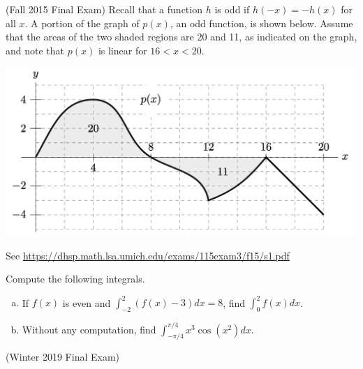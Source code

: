 \documentclass[11pt]{exam}
\begin{document}
\begin{questions}
\begin{solution}
\begin{enumerate}
  \end{enumerate}
\end{solution}
\question (Fall 2015 Final Exam)
Recall that a function \(h\) is odd if \(h(-x) = -h(x)\) for all \(x\). A portion of the graph
of \(p(x)\), an odd function, is shown below. Assume that the areas of the two shaded regions are
20 and 11, as indicated on the graph, and note that \(p(x)\) is linear for \(16 < x < 20\).
\begin{center}
  \includegraphics[scale=0.5]{graph_f15}
\end{center}
\begin{solution}
  See \href{https://dhsp.math.lsa.umich.edu/exams/115exam3/f15/s1.pdf}{https://dhsp.math.lsa.umich.edu/exams/115exam3/f15/s1.pdf}
\end{solution}
\pagebreak
\question Compute the following integrals.
  \begin{enumerate}[(a)]
\item If $f(x)$ is even and $\int_{-2}^{2} ( f(x) - 3) dx = 8$, find $\int_{0}^2 f(x) dx$. 
\item Without any computation, find $\int_{-\pi/4}^{\pi/4} x^3 \cos( x^2 ) dx$. 
  \end{enumerate}
\question (Winter 2019 Final Exam) 


\end{questions}
\end{document}
